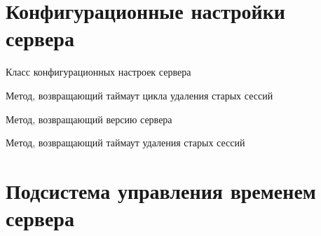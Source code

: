 \documentclass[letterpaper,10pt,english]{sphinxmanual}
\begin{document}
\section{Конфигурационные настройки сервера}
\label{config:module-mainServer.configurationManager}\label{config:id1}

\begin{fulllineitems}
\label{config:mainServer.configurationManager.ConfigurationManager}
Класс конфигурационных настроек сервера

\begin{fulllineitems}
\label{config:mainServer.configurationManager.ConfigurationManager.loopDeleteSessionInterval}
Метод, возвращающий таймаут цикла удаления старых сессий

\end{fulllineitems}


\begin{fulllineitems}
\label{config:mainServer.configurationManager.ConfigurationManager.serverVersion}
Метод, возвращающий версию сервера

\end{fulllineitems}


\begin{fulllineitems}
\label{config:mainServer.configurationManager.ConfigurationManager.sessionDeleteInterval}
Метод, возвращающий таймаут удаления старых сессий

\end{fulllineitems}


\end{fulllineitems}



\section{Подсистема управления временем сервера}
\label{config:id2}\label{config:module-mainServer.timeManager}
\end{document}
